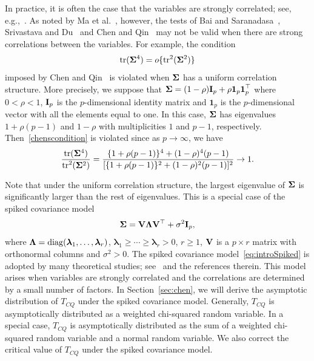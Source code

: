 \documentclass[times,sort&compress,3p]{elsarticle}
\newcommand{\mytr}{ {\rm tr} }
\newcommand{\mydiag}{ {\rm diag} }
\newcommand{\bfsym}[1]{\ensuremath{\boldsymbol{#1}}}
\def\blambda {\bfsym {\lambda}}        \def\bLambda {\bfsym {\Lambda}}
\theoremstyle{plain}
\theoremstyle{definition}
\theoremstyle{remark}
\begin{document}
In practice, it is often the case that the variables are strongly correlated;
see, e.g.,~\cite{Chen2011A,Ma2015A,Thulin2014A}.
As noted by Ma {\rm et al.}~\cite{Ma2015A}, however, the tests of Bai and Saranadasa~\cite{Bai1996Efiect}, Srivastava and Du~\cite{Srivastava2008A} and Chen and Qin~\cite{Chen2010A} may not be valid when there are strong correlations between the variables.
For example, the condition 
\begin{equation}\label{chenscondition}
    \mathrm{tr}(\bSigma^4)=o\{\mathrm{tr}^2(\bSigma^2)\}
\end{equation}
imposed by Chen and Qin~\cite{Chen2010A} is violated when $\bSigma$ has a uniform correlation structure.
More precisely, we suppose that
$\bSigma=(1-\rho)\BI_p+\rho\textbf{1}_p \textbf{1}_p^\top $ where $0<\rho<1$, $\mathbf{I}_p$ is the $p$-dimensional identity matrix and $\bm{1}_p$ is the $p$-dimensional vector with all the elements equal to one.
In this case, $\bSigma$ has eigenvalues $1+\rho(p-1) $ and $1-\rho$ with multiplicities $1$ and $p-1$, respectively. Then~\eqref{chenscondition} is violated since as $p\to \infty$, we have
$$
\frac{\mytr (\bSigma^4)}{\mytr^2(\bSigma^2)}=\frac{\{1+\rho(p-1)\}^4 + (1-\rho)^4 (p-1)}{[ \{1+\rho(p-1)\}^2+(1-\rho)^2 (p-1) ]^2}\to 1.
$$

  Note that under the uniform correlation structure, the largest eigenvalue of $\bSigma$ is significantly larger than the rest of eigenvalues.
  This is a special case of the spiked covariance model
 \begin{equation}\label{eq:introSpiked}
 \bSigma =\BV\bLambda \BV^\top  +\sigma^2 \BI_p,
 \end{equation}
 where $\bLambda=\mydiag(\blambda_1,\ldots,\blambda_r)$, $\blambda_1\geq \cdots\geq \blambda_r>0$, $r\geq 1$, $\mathbf{V}$ is a $p\times r$ matrix with orthonormal columns and $\sigma^2>0$.
The spiked covariance model~\eqref{eq:introSpiked} is adopted by many theoretical studies; see~\cite{Birnbaum2013,Cai2012Sparse,Passemier2015} and the references therein.
This model arises when variables are strongly correlated and the correlations are determined by a small number of factors.
 In Section~\ref{sec:chen}, we will derive the asymptotic distribution of $T_{CQ}$ under the spiked covariance model. 
Generally, $T_{CQ}$ is asymptotically distributed as a weighted chi-squared random variable.
In a special case, $T_{CQ}$ is asymptotically distributed as the sum of a weighted chi-squared random variable and a normal random variable. 
We also correct the critical value of $T_{CQ}$ under the spiked covariance model.
\end{document}
